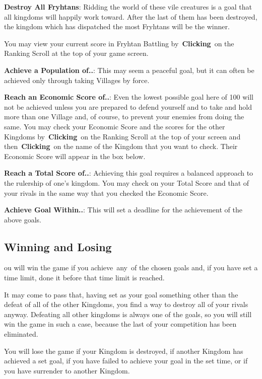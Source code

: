 \textbf{Destroy All Fryhtans}: Ridding the world of these vile creatures is a goal that all kingdoms will happily work toward. After the last of them has been destroyed, the kingdom which has dispatched the most Fryhtans will be the winner.

You may view your current score in Fryhtan Battling by \textbf{Clicking} on the Ranking Scroll at the top of your game screen.

\textbf{Achieve a Population of..}: This may seem a peaceful goal, but it can often be achieved only through taking Villages by force.

\textbf{Reach an Economic Score of..}: Even the lowest possible goal here of 100 will not be achieved unless you are prepared to defend yourself and to take and hold more than one Village and, of course, to prevent your enemies from doing the same. You may check your Economic Score and the scores for the other Kingdoms by \textbf{Clicking} on the Ranking Scroll at the top of your screen and then \textbf{Clicking} on the name of the Kingdom that you want to check. Their Economic Score will appear in the box below.

\textbf{Reach a Total Score of..}: Achieving this goal requires a balanced approach to the rulership of one’s kingdom. You may check on your Total Score and that of your rivals in the same way that you checked the Economic Score.

\textbf{Achieve Goal Within..}: This will set a deadline for the achievement of the above goals.

\subsection{Winning and Losing}

ou will win the game if you achieve any of the chosen goals and, if you have set a time limit, done it before that time limit is reached.

It may come to pass that, having set as your goal something other than the defeat of all of the other Kingdoms, you find a way to destroy all of your rivals anyway. Defeating all other kingdoms is always one of the goals, so you will still win the game in such a case, because the last of your competition has been eliminated.

You will lose the game if your Kingdom is destroyed, if another Kingdom has achieved a set goal, if you have failed to achieve your goal in the set time, or if you have surrender to another Kingdom.

